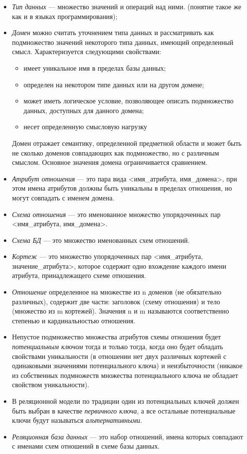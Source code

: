 \begin{itemize}
	\item \textit{Тип данных} --- множество значений и операций над ними. (понятие такое же как и в языках программирования);
	\item \textit{Домен} можно считать уточнением типа данных и рассматривать как подмножество значений некоторого типа данных, имеющий определенный смысл. 
	Характеризуется следующими свойствами:
	\begin{itemize}
		\item имеет уникальное имя в пределах базы данных;
		\item определен на некотором типе данных или на другом домене;
		\item может иметь логическое условие, позволяющее описать подмножество данных, доступных для данного домена;
		\item несет определенную смысловую нагрузку
	\end{itemize}
	Домен отражает семантику, определенной предметной области и может быть не сколько доменов совпадающих как подмножество, но с различным смыслом. Основное значения домена ограничивается сравнением.
	\item \textit{Атрибут отношения} --- это пара вида <имя\_атрибута, имя\_домена>, при этом имена атрибутов должны быть уникальны в пределах отношения, но могут совпадать с именем домена.
	\item \textit{Схема отношения} --- это именованное множество упорядоченных пар <имя\_атрибута, имя\_домена>.
	\item \textit{Схема БД} --- это множество именованных схем отношений.
	\item \textit{Кортеж} --- это множество упорядоченных пар <имя\_атрибута, значение\_атрибута>, которое содержит одно вхождение каждого имени атрибута, принадлежащего схеме отношения.
	\item \textit{Отношение} определенное на множестве из n доменов (не обязательно различных), содержит две части: заголовок (схему отношения) и тело (множество из m кортежей). Значения n и m называются соответственно степенью и кардинальностью отношения.
	\item Непустое подмножество множества атрибутов схемы отношения будет \textit{потенциальным ключом} тогда и только тогда, 
	когда оно будет обладать свойствами уникальности (в отношении нет двух различных кортежей с одинаковыми 
	значениями потенциального ключа) и неизбыточности (никакое из собственных подмножеств множества 
	потенциального ключа не обладает свойством уникальности). 
	\item В реляционной модели по традиции один из потенциальных ключей должен быть выбран в качестве \textit{первичного ключа}, а все остальные потенциальные ключи будут называться \textit{альтернативными}.
	\item \textit{Реляционная база данных} --- это набор отношений, имена которых совпадают с именами схем отношений в схеме базы данных.
\end{itemize}

